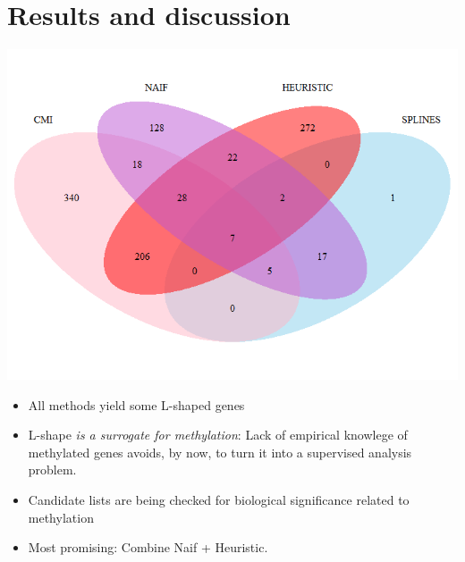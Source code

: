 \section{Results and discussion}

\begin{center}
	\includegraphics[width=0.8\columnwidth]{./images/vennLgenes.png}
\end{center}

\begin {itemize}
\item All methods yield some L-shaped genes
\item L-shape\textit{ is a surrogate for methylation}: Lack of empirical knowlege of methylated genes avoids, by now, to turn it into a supervised analysis problem.
\item Candidate lists are being checked for biological significance related to methylation
\item Most promising: Combine Naif + Heuristic.
\end{itemize}



